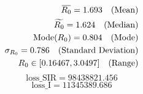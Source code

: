\documentclass[tikz,fleqn,12pt]{wlscirep}
\newcommand{\overbar}[1]{\mkern 1.5mu\overline{\mkern-1.5mu#1\mkern-1.5mu}\mkern 1.5mu}
\begin{document}
\begin{equation}
  \begin{split}
    \overbar{R_0} = 1.693 \quad \text{(Mean)} \\
    \widetilde{R_0} = 1.624 \quad \text{(Median)} \\
    \text{Mode}(R_0) = 0.804 \quad \text{(Mode)} \\
    \sigma_{R_0} = 0.786 \quad \text{(Standard Deviation)} \\
    R_0 \in [0.16467, 3.0497] \quad \text{(Range)}
  \end{split}
  \label{eq:r0_with_lockdown}
\end{equation}
\begin{equation}
  \textrm{loss\_SIR} = 98438821.456
  \label{eq:cost_SIR_with_lockdown}
\end{equation}
\begin{equation}
  \textrm{loss\_I} = 11345389.686
  \label{eq:cost_I_with_lockdown}
\end{equation}
\end{document}
